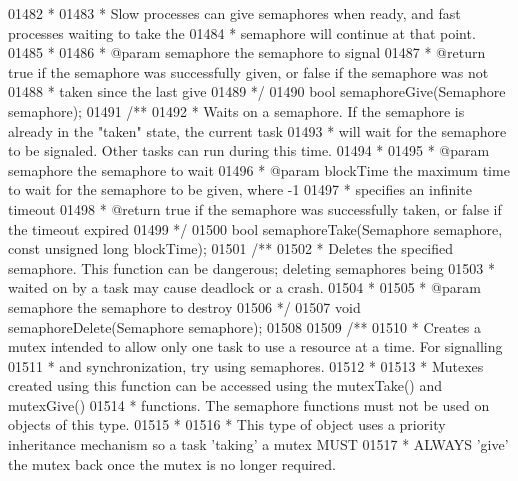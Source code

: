 \begin{DoxyCode}
{{{{{{{{{01482 \textcolor{comment}{ *}
01483 \textcolor{comment}{ * Slow processes can give semaphores when ready, and fast processes waiting to take the}
01484 \textcolor{comment}{ * semaphore will continue at that point.}
01485 \textcolor{comment}{ *}
01486 \textcolor{comment}{ * @param semaphore the semaphore to signal}
01487 \textcolor{comment}{ * @return true if the semaphore was successfully given, or false if the semaphore was not}
01488 \textcolor{comment}{ * taken since the last give}
01489 \textcolor{comment}{ */}
01490 \textcolor{keywordtype}{bool} semaphoreGive(Semaphore semaphore);
01491 \textcolor{comment}{/**}
01492 \textcolor{comment}{ * Waits on a semaphore. If the semaphore is already in the "taken" state, the current task}
01493 \textcolor{comment}{ * will wait for the semaphore to be signaled. Other tasks can run during this time.}
01494 \textcolor{comment}{ *}
01495 \textcolor{comment}{ * @param semaphore the semaphore to wait}
01496 \textcolor{comment}{ * @param blockTime the maximum time to wait for the semaphore to be given, where -1}
01497 \textcolor{comment}{ * specifies an infinite timeout}
01498 \textcolor{comment}{ * @return true if the semaphore was successfully taken, or false if the timeout expired}
01499 \textcolor{comment}{ */}
01500 \textcolor{keywordtype}{bool} semaphoreTake(Semaphore semaphore, \textcolor{keyword}{const} \textcolor{keywordtype}{unsigned} \textcolor{keywordtype}{long} blockTime);
01501 \textcolor{comment}{/**}
01502 \textcolor{comment}{ * Deletes the specified semaphore. This function can be dangerous; deleting semaphores being}
01503 \textcolor{comment}{ * waited on by a task may cause deadlock or a crash.}
01504 \textcolor{comment}{ *}
01505 \textcolor{comment}{ * @param semaphore the semaphore to destroy}
01506 \textcolor{comment}{ */}
01507 \textcolor{keywordtype}{void} semaphoreDelete(Semaphore semaphore);
01508 
01509 \textcolor{comment}{/**}
01510 \textcolor{comment}{ * Creates a mutex intended to allow only one task to use a resource at a time. For signalling}
01511 \textcolor{comment}{ * and synchronization, try using semaphores.}
01512 \textcolor{comment}{ *}
01513 \textcolor{comment}{ * Mutexes created using this function can be accessed using the mutexTake() and mutexGive()}
01514 \textcolor{comment}{ * functions. The semaphore functions must not be used on objects of this type.}
01515 \textcolor{comment}{ *}
01516 \textcolor{comment}{ * This type of object uses a priority inheritance mechanism so a task 'taking' a mutex MUST}
01517 \textcolor{comment}{ * ALWAYS 'give' the mutex back once the mutex is no longer required.}
}}}}}}}}}
\end{DoxyCode}

